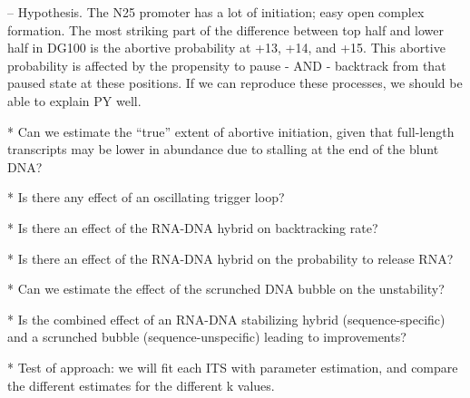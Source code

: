     -- Hypothesis. The N25 promoter has a lot of initiation; easy open complex
    formation. The most striking part of the difference between top half and
    lower half in DG100 is the abortive probability at +13, +14, and +15. This
    abortive probability is affected by the propensity to pause - AND -
    backtrack from that paused state at these positions. If we can reproduce
    these processes, we should be able to explain PY well.

* Can we estimate the ``true'' extent of abortive initiation, given that
  full-length transcripts may be lower in abundance due to stalling at the end of
  the blunt DNA?

* Is there any effect of an oscillating trigger loop?

* Is there an effect of the RNA-DNA hybrid on backtracking rate?

* Is there an effect of the RNA-DNA hybrid on the probability to release RNA?

* Can we estimate the effect of the scrunched DNA bubble on the unstability?

* Is the combined effect of an RNA-DNA stabilizing hybrid (sequence-specific)
  and a scrunched bubble (sequence-unspecific) leading to improvements?

* Test of approach: we will fit each ITS with parameter estimation, and compare
  the different estimates for the different k values.
